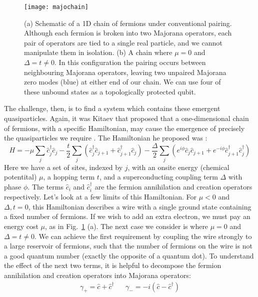 \begin{figure}
  \texttt{[image: majochain]}
  \caption[1D chain of fermions, forming a Majorana zero modes]
  {\label{fig:majo}(a) Schematic of a 1D chain of fermions under conventional pairing. Although each fermion is broken into two
  Majorana operators, each pair of operators are tied to a single real particle, and we cannot manipulate them in isolation.
  (b) A chain where $\mu = 0$ and $\Delta = t \neq 0$. In this configuration the pairing occurs between neighbouring Majorana operators,
  leaving two unpaired Majorana zero modes (blue) at either end of our chain. We can use four of these unbound states as a
  topologically protected qubit.}
\end{figure}

The challenge, then, is to find a system which contains these emergent quasiparticles. Again, it was Kitaev that proposed that
a one-dimensional chain of fermions, with a specific Hamiltonian, may cause the emergence of precisely the quasiparticles we require \cite{Kitaev_2001}.
The Hamiltonian he proposed was \cite{Alicea_2012}:
\begin{equation}
  H = -\mu\sum_j \hat c_j^\dagger \hat c_j - \frac{t}{2}\sum_j\left(\hat c_j^\dagger \hat c_{j+1} + \hat c_{j+1}^\dagger \hat c_j\right)
      -\frac{\Delta}{2}\sum_j\left(e^{i\phi}\hat c_j\hat c_{j+1} + e^{-i\phi} \hat c_{j+1}^\dagger \hat c_j^\dagger\right)
  \label{eq:kith}
\end{equation}
Here we have a set of sites, indexed by $j$, with an onsite energy (chemical potentital) $\mu$, a hopping term $t$, and a superconducting coupling
term $\Delta$ with phase $\phi$. The terms $\hat c_i$ and $\hat c_i^\dagger$ are the fermion annihilation and creation operators respectively.
Let's look at a few limits of this Hamiltonian. For $\mu < 0$ and $\Delta, t = 0$, this Hamiltonian describes a wire with a single ground state containing a fixed
number of fermions. If we wish to add an extra electron, we must pay an energy cost $\mu$, as in Fig.~\ref{fig:majo} (a). The next case we consider is where $\mu=0$ and
$\Delta = t \neq 0$. We can achieve the first requirement by coupling the wire strongly to a large reservoir of fermions, such that the number of
fermions on the wire is not a good quantum number (exactly the opposite of a quantum dot). To understand the effect of the next two terms, it is
helpful to decompose the fermion annihilation and creation operators into Majorana operators:
\begin{align}
  \gamma_+ = \hat c + \hat c^\dagger && \gamma_- = -i(\hat c - \hat c^\dagger)
\end{align}
